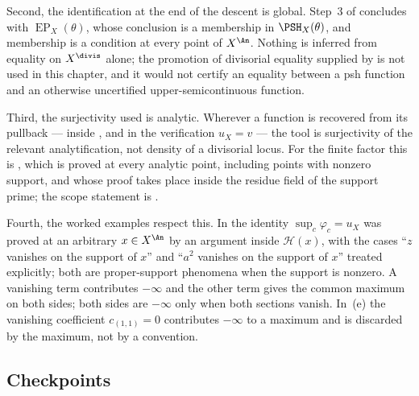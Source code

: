 Second, the identification at the end of the descent is global.  Step~3 of
 concludes with
$\operatorname{EP}_X(\theta)$, whose conclusion is a membership in
$\PSH_X(\theta)$, and membership is a condition at every point of
$X^{\An}$.  Nothing is inferred from equality on $X^{\divis}$ alone; the
promotion of divisorial equality supplied by
 is not used in this chapter, and it
would not certify an equality between a psh function and an
otherwise uncertified upper-semicontinuous function.

Third, the surjectivity used is analytic.  Wherever a function is recovered
from its pullback --- inside , and in the
verification $u_X=v$ --- the tool is surjectivity of the relevant
analytification, not density of a divisorial locus.  For the finite factor
this is , which is proved at every analytic
point, including points with nonzero support, and whose proof takes place
inside the residue field of the support prime; the scope statement is
.

Fourth, the worked examples respect this.  In  the
identity $\sup_c\varphi_c=u_X$ was proved at an arbitrary
$x\in X^{\An}$ by an argument inside $\mathcal H(x)$, with the cases
``$z$ vanishes on the support of $x$'' and ``$a^2$ vanishes on the
support of $x$'' treated explicitly; both are proper-support phenomena
when the support is nonzero.  A vanishing term contributes $-\infty$ and
the other term gives the common maximum on both sides; both sides are
$-\infty$ only when both sections vanish.  In
\,(e) the vanishing coefficient
$c_{(1,1)}=0$ contributes $-\infty$ to a maximum and is discarded by the
maximum, not by a convention.

\subsection{Checkpoints}
\label{sec:ch42-checkpoints}

